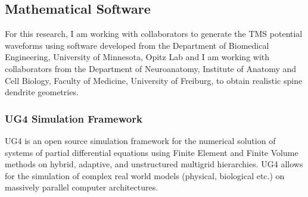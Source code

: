 \documentclass[12pt]{article}
\begin{document}
\subsection*{Mathematical Software}
For this research, I am working with collaborators to generate the TMS potential waveforms using software developed from the Department of Biomedical Engineering, University of Minnesota, Opitz Lab and I am working with collaborators from the  Department of Neuroanatomy, Institute of Anatomy and Cell Biology, Faculty of Medicine, University of Freiburg, to obtain realistic spine dendrite geometries.
\subsubsection*{UG4 Simulation Framework}
UG4 is an open source simulation framework for the numerical solution of systems of partial differential equations \cite{Vogel2013} using Finite Element and Finite Volume methods on hybrid, adaptive, and unstructured multigrid hierarchies. UG4 allows for the simulation of complex real world models (physical, biological etc.) on massively parallel computer architectures. 

\end{document}
